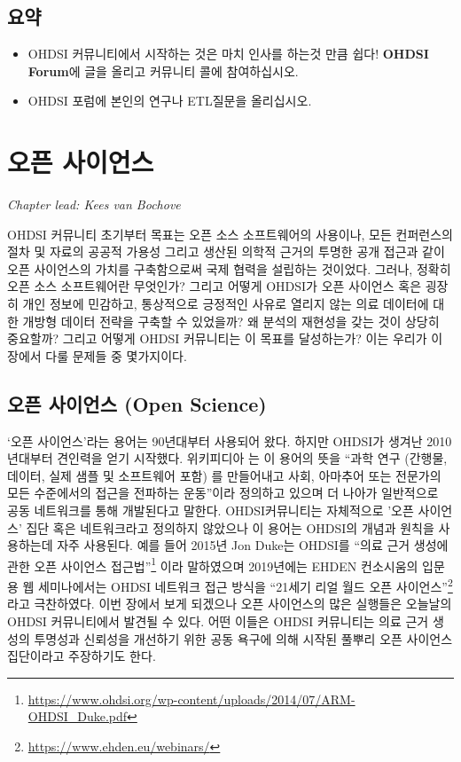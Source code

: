 \documentclass[11pt]{book}
\let\rmarkdownfootnote\footnote%
\def\footnote{\protect\rmarkdownfootnote}
\theoremstyle{definition}
\theoremstyle{definition}
\theoremstyle{definition}
\theoremstyle{remark}
\let\BeginKnitrBlock\begin \let\EndKnitrBlock\end
\begin{document}
\section{요약}\label{-1}

\BeginKnitrBlock{rmdsummary}
\begin{itemize}
\item
  OHDSI 커뮤니티에서 시작하는 것은 마치 인사를 하는것 만큼 쉽다!
  \textbf{OHDSI Forum}에 글을 올리고 커뮤니티 콜에 참여하십시오.
\item
  OHDSI 포럼에 본인의 연구나 ETL질문을 올리십시오.
\end{itemize}
\EndKnitrBlock{rmdsummary}

\chapter{오픈 사이언스}\label{OpenScience}


\emph{Chapter lead: Kees van Bochove}

OHDSI 커뮤니티 초기부터 목표는 오픈 소스 소프트웨어의 사용이나, 모든
컨퍼런스의 절차 및 자료의 공공적 가용성 그리고 생산된 의학적 근거의
투명한 공개 접근과 같이 오픈 사이언스의 가치를 구축함으로써 국제 협력을
설립하는 것이었다. 그러나, 정확히 오픈 소스 소프트웨어란 무엇인가?
그리고 어떻게 OHDSI가 오픈 사이언스 혹은 굉장히 개인 정보에 민감하고,
통상적으로 긍정적인 사유로 열리지 않는 의료 데이터에 대한 개방형 데이터
전략을 구축할 수 있었을까? 왜 분석의 재현성을 갖는 것이 상당히 중요할까?
그리고 어떻게 OHDSI 커뮤니티는 이 목표를 달성하는가? 이는 우리가 이
장에서 다룰 문제들 중 몇가지이다.

\section{오픈 사이언스 (Open Science)}\label{--open-science}

`오픈 사이언스'라는 용어는 90년대부터 사용되어 왔다. 하지만 OHDSI가
생겨난 2010년대부터 견인력을 얻기 시작했다. 위키피디아
\citep{wiki:Open_science} 는 이 용어의 뜻을 ``과학 연구 (간행물, 데이터,
실제 샘플 및 소프트웨어 포함) 를 만들어내고 사회, 아마추어 또는 전문가의
모든 수준에서의 접근을 전파하는 운동''이라 정의하고 있으며 더 나아가
일반적으로 공동 네트워크를 통해 개발된다고 말한다. OHDSI커뮤니티는
자체적으로 '오픈 사이언스' 집단 혹은 네트워크라고 정의하지 않았으나 이
용어는 OHDSI의 개념과 원칙을 사용하는데 자주 사용된다. 예를 들어 2015년
Jon Duke는 OHDSI를 ``의료 근거 생성에 관한 오픈 사이언스
접근법''\footnote{\url{https://www.ohdsi.org/wp-content/uploads/2014/07/ARM-OHDSI_Duke.pdf}}
이라 말하였으며 2019년에는 EHDEN 컨소시움의 입문용 웹 세미나에서는 OHDSI
네트워크 접근 방식을 ``21세기 리얼 월드 오픈 사이언스''\footnote{\url{https://www.ehden.eu/webinars/}}
라고 극찬하였다. 이번 장에서 보게 되겠으나 오픈 사이언스의 많은 실행들은
오늘날의 OHDSI 커뮤니티에서 발견될 수 있다. 어떤 이들은 OHDSI 커뮤니티는
의료 근거 생성의 투명성과 신뢰성을 개선하기 위한 공동 욕구에 의해 시작된
풀뿌리 오픈 사이언스 집단이라고 주장하기도 한다.
\end{document}
